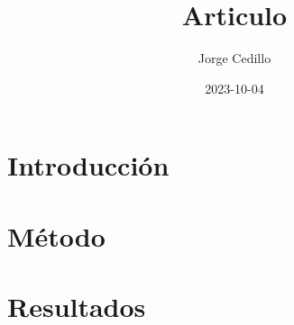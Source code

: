 \documentclass{article}
\begin{document}
\title{Articulo}
\author{Jorge Cedillo}
\date{2023-10-04}

\maketitle

\newpage

\tableofcontents

\newpage

\section{Introducción}


\section{Método}

\section{Resultados}


\end{document}
